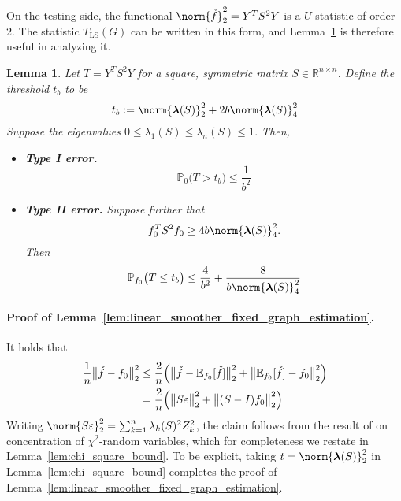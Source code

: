 \documentclass{article}
\newcommand{\Reals}{\mathbb{R}}
\newcommand{\1}{\mathbf{1}}
\newcommand{\lambdavec}{\boldsymbol{\lambda}}
\newcommand{\Pbb}{\mathbb{P}}
\newcommand{\Ebb}{\mathbb{E}}
\newcommand{\LS}{\mathrm{LS}}
\theoremstyle{alden}
\theoremstyle{aldenthm}
\newtheorem{lemma}{Lemma}
\theoremstyle{definition}
\theoremstyle{remark}
\begin{document}
On the testing side, the functional $\norm{\check{f}}_2^2 = Y^T S^2 Y$ is a $U$-statistic of order $2$. The statistic $T_{\LS}(G)$ can be written in this form, and Lemma~\ref{lem:linear_smoother_fixed_graph_testing} is therefore useful in analyzing it.
\begin{lemma}
	\label{lem:linear_smoother_fixed_graph_testing}
	Let $T = Y^T S^2 Y$ for a square, symmetric matrix $S \in \Reals^{n \times n}$. Define the threshold $t_b$ to be 
	\begin{equation}
	t_{b} := \norm{\lambdavec(S)}_2^2 + 2b \norm{\lambdavec(S)}_4^2
	\end{equation}
	Suppose the eigenvalues $0 \leq \lambda_{1}(S) \leq \lambda_{n}(S) \leq 1$. Then,
	\begin{itemize}
		\item \textbf{Type I error.}
		\begin{equation}
		\label{eqn:linear_smoother_fixed_graph_testing_typeI}
		\Pbb_0\bigl(T > t_b\bigr) \leq \frac{1}{b^2}
		\end{equation}
		\item \textbf{Type II error.} Suppose further that
		\begin{equation}
		\label{eqn:linear_smoother_fixed_graph_testing_critical_radius}
		f_0^T S^2 f_0 \geq 4b \norm{\lambdavec(S)}_4^2.
		\end{equation}
		Then
		\begin{equation}
		\label{eqn:linear_smoother_fixed_graph_testing_typeII}
		\Pbb_{f_0}\bigl(T \leq t_b\bigr) \leq \frac{4}{b^2} + \frac{8}{b \norm{\lambdavec(S)}_4^{2}} 
		\end{equation}
	\end{itemize}
\end{lemma}

\paragraph{Proof of Lemma~\ref{lem:linear_smoother_fixed_graph_estimation}.}
It holds that
\begin{align*}
\frac{1}{n}\bigl\|\check{f} - f_0\bigr\|_2^2 & \leq \frac{2}{n}\Bigl(\bigl\|\check{f} - \Ebb_{f_0}[\check{f}]\bigr\|_2^2 + \bigl\|\Ebb_{f_0}[\check{f}] - f_0\bigr\|_2^2\Bigr) \\ 
& = \frac{2}{n}\Bigl(\bigl\|S\varepsilon\bigr\|_2^2 + \bigl\|(S - I)f_0\bigr\|_2^2\Bigr)
\end{align*}
Writing $\norm{S\varepsilon}_2^2 = \sum_{k = 1}^{n} \lambda_k(S)^2 Z_k^2$, the claim follows from the result of \cite{laurent00} on concentration of $\chi^2$-random variables, which for completeness we restate in Lemma~\ref{lem:chi_square_bound}. To be explicit, taking $t = \norm{\lambdavec(S)}_2^2$ in Lemma~\ref{lem:chi_square_bound} completes the proof of Lemma~\ref{lem:linear_smoother_fixed_graph_estimation}. 
 
\end{document}
